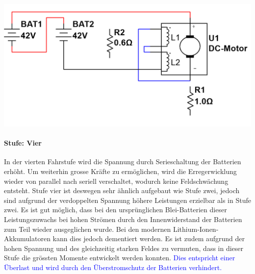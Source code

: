 \begin{minipage}{0.49\textwidth}
	\includegraphics[width=\columnwidth]{images/Stufenschalter/Stufe_4.png}%
\end{minipage}
\begin{minipage}{0.5\textwidth}
	\paragraph{Stufe: Vier}
	In der vierten Fahrstufe wird die Spannung durch Serieschaltung der Batterien erhöht. Um weiterhin grosse Kräfte zu ermöglichen, wird die Erregerwicklung wieder von parallel nach seriell verschaltet, wodurch keine Feldschwächung entsteht. Stufe vier ist deswegen sehr ähnlich aufgebaut wie Stufe zwei, jedoch sind aufgrund der verdoppelten Spannung höhere Leistungen erzielbar als in Stufe zwei. Es ist gut möglich, dass bei den ursprünglichen Blei-Batterien dieser Leistungszuwachs bei hohen Strömen durch den Innenwiderstand der Batterien zum Teil wieder ausgeglichen wurde. Bei den modernen Lithium-Ionen-Akkumulatoren kann dies jedoch dementiert werden. Es ist zudem aufgrund der hohen Spannung und des gleichzeitig starken Feldes zu vermuten, dass in dieser Stufe die grössten Momente entwickelt werden konnten. \textcolor{blue}{Dies entspricht einer Überlast und wird durch den Überstromschutz der Batterien verhindert.}
\end{minipage}

